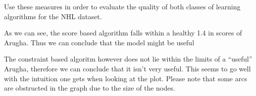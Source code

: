 \documentclass[]{article}
\newenvironment{Shaded}{\begin{snugshade}}{\end{snugshade}}
\newcommand{\KeywordTok}[1]{\textcolor[rgb]{0.13,0.29,0.53}{\textbf{{#1}}}}
\newcommand{\DataTypeTok}[1]{\textcolor[rgb]{0.13,0.29,0.53}{{#1}}}
\newcommand{\DecValTok}[1]{\textcolor[rgb]{0.00,0.00,0.81}{{#1}}}
\newcommand{\StringTok}[1]{\textcolor[rgb]{0.31,0.60,0.02}{{#1}}}
\newcommand{\CommentTok}[1]{\textcolor[rgb]{0.56,0.35,0.01}{\textit{{#1}}}}
\newcommand{\NormalTok}[1]{{#1}}
\begin{document}
Use these measures in order to evaluate the quality of both classes of
learning algorithms for the NHL dataset.

As we can see, the score based algorithm falls within a healthy 1.4 in
scores of Arugha. Thus we can conclude that the model might be useful

The constraint based algoritm however does not lie within the limits of
a ``useful'' Arugha, therefore we can conclude that it isn't very
useful. This seems to go well with the intuition one gets when looking
at the plot. Please note that some arcs are obstructed in the graph due
to the size of the nodes.

\begin{Shaded}
\end{Shaded}
\end{document}
